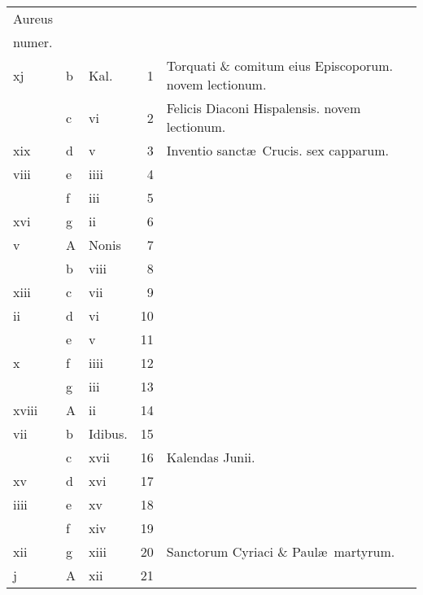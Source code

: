 \documentclass[openany]{book}
\begin{document}
\begin{center}
\begin{tabular}{l | l | l | r | l r}
\color{Red}Aureus & & & & \color{Red} \\
\color{Red}numer. & & & & \color{Red} \\
\color{Red} xj & b & \color{Red} Kal. & 1 & Torquati \& comitum eius Episcoporum. \color{Red} novem lectionum. & \color{Red} \\
\color{Red}  & c & \color{Red} vi & 2 & Felicis Diaconi Hispalensis. \color{Red} novem lectionum. & \color{Red} \\
\color{Red} xix & d & \color{Red} v & 3 & Inventio sanct\ae \ Crucis. \color{Red} sex capparum. & \color{Red} \\
\color{Red} viii & e & \color{Red} iiii & 4 & & \color{Red} \\
\color{Red}  & f & \color{Red} iii & 5 & & \color{Red} \\
\color{Red} xvi & g & \color{Red} ii & 6 & & \color{Red} \\
\color{Red} v & \color{Red} A & Nonis & 7 & & \color{Red} \\
\color{Red}  & b & \color{Red} viii & 8 & & \color{Red} \\
\color{Red} xiii & c & \color{Red} vii & 9 & & \color{Red} \\
\color{Red} ii & d & \color{Red} vi & 10 & & \color{Red} \\
\color{Red}  & e & \color{Red} v & 11 & & \color{Red} \\
\color{Red} x & f & \color{Red} iiii & 12 & & \color{Red} \\
\color{Red}  & g & \color{Red} iii & 13 & & \color{Red} \\
\color{Red} xviii & \color{Red} A & \color{Red} ii & 14 & & \color{Red} \\
\color{Red} vii & b & Idibus. & 15 & & \color{Red} \\
\color{Red}  & c & \color{Red} xvii & 16 & \qquad \color{Red} Kalendas Junii. & \color{Red} \\
\color{Red} xv & d & \color{Red} xvi & 17 & & \color{Red} \\
\color{Red} iiii & e & \color{Red} xv & 18 & & \color{Red} \\
\color{Red}  & f & \color{Red} xiv & 19 & & \color{Red} \\
\color{Red} xii & g & \color{Red} xiii & 20 & Sanctorum Cyriaci \& Paul\ae \ martyrum. & \color{Red} \\
\color{Red} j & \color{Red} A & \color{Red} xii & 21 & & \color{Red} \\

\end{tabular}
\end{center}
\end{document}
